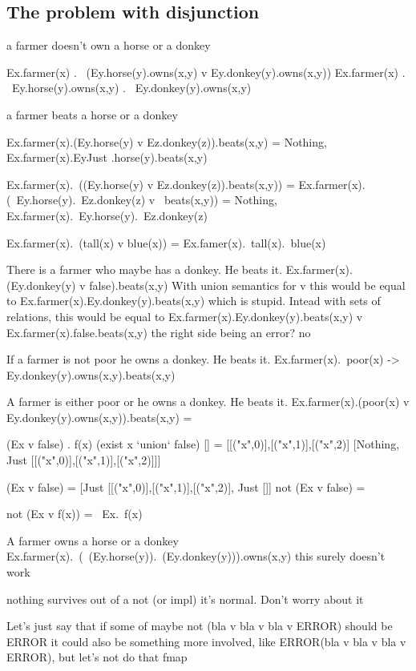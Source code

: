 \documentclass[12pt]{article}
\begin{document}
\subsection{The problem with disjunction}


a farmer doesn't own a horse or a donkey

Ex.farmer(x) . ~(Ey.horse(y).owns(x,y) v Ey.donkey(y).owns(x,y))
Ex.farmer(x) . ~Ey.horse(y).owns(x,y) . ~Ey.donkey(y).owns(x,y)

a farmer beats a horse or a donkey

Ex.farmer(x).(Ey.horse(y) v Ez.donkey(z)).beats(x,y) = {Nothing, Ex.farmer(x).EyJust .horse(y).beats(x,y)}

Ex.farmer(x).~((Ey.horse(y) v Ez.donkey(z)).beats(x,y)) =
Ex.farmer(x).(~Ey.horse(y).~Ez.donkey(z) v ~beats(x,y)) = {Nothing, Ex.farmer(x).~Ey.horse(y).~Ez.donkey(z)}

Ex.farmer(x).~(tall(x) v blue(x)) = Ex.famer(x).~tall(x).~blue(x)

There is a farmer who maybe has a donkey. He beats it.
Ex.farmer(x).(Ey.donkey(y) v false).beats(x,y)
With union semantics for v this would be equal to
Ex.farmer(x).Ey.donkey(y).beats(x,y)
which is stupid.
Intead with sets of relations, this would be equal to
Ex.farmer(x).Ey.donkey(y).beats(x,y) v Ex.farmer(x).false.beats(x,y)
the right side being an error? no

If a farmer is not poor he owns a donkey. He beats it.
Ex.farmer(x).~poor(x) -> Ey.donkey(y).owns(x,y).beats(x,y)

A farmer is either poor or he owns a donkey. He beats it.
Ex.farmer(x).(poor(x) v Ey.donkey(y).owns(x,y)).beats(x,y) =

(Ex v false) . f(x)
(exist x `union` false) [] = [[("x",0)],[("x",1)],[("x",2)]
[Nothing, Just [[("x",0)],[("x",1)],[("x",2)]]]


(Ex v false) = [Just [[("x",0)],[("x",1)],[("x",2)], Just []]
not (Ex v false) =

not (Ex v f(x))
= ~Ex.~f(x)

A farmer owns a horse or a donkey
Ex.farmer(x).~(~(Ey.horse(y)).~(Ey.donkey(y))).owns(x,y)   this surely doesn't work


nothing survives out of a not (or impl) it's normal. Don't worry about it

Let's just say that if some of 
maybe not (bla v bla v bla v ERROR) should be ERROR
it could also be something more involved, like ERROR(bla v bla v bla v ERROR), but let's not do that
fmap
\end{document}
